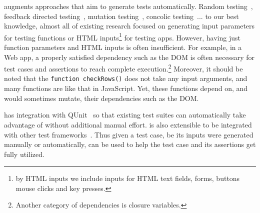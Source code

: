 \tool augments approaches that aim to generate tests automatically.  
Random testing~\cite{}, feedback directed testing~\cite{}, mutation testing~\cite{}, concolic testing~\cite{}... to our best knowledge, almost all of existing research focused on generating input parameters for testing functions or HTML inputs\footnote{by HTML inputs we include inputs for HTML text fields, forms, buttons mouse clicks and key presses.} for testing apps.
However, having just function parameters and HTML inputs is often insufficient.  For example, in a Web app, a properly satisfied dependency such as the DOM is often necessary for test cases and assertions to reach complete execution.\footnote{Another category of dependencies is closure variables.}
Moreover, it should be noted that the {\tt function checkRows()} does not take any input arguments, and many functions are like that in JavaScript.
Yet, these functions depend on, and would sometimes mutate, their dependencies such as the DOM.

\tool has integration with QUnit~\cite{qunit} so that existing test suites can automatically take advantage of \tool without additional manual effort.  \tool is also extensible to be integrated with other test frameworks~\cite{jstests}.
Thus given a test case, be its inputs were generated manually or automatically, \tool can be used to help the test case and its assertions get fully utilized.

